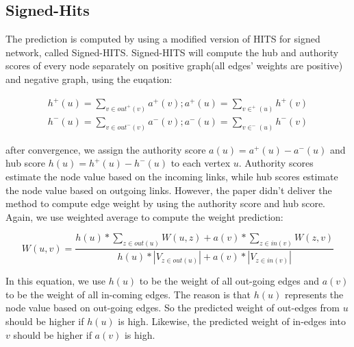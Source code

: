 
\subsection{Signed-Hits}

The prediction is computed by using a modified version of HITS for signed network, called Signed-HITS\cite{shahriari2014ranking}. Signed-HITS will compute the hub and authority scores of every node separately on positive graph(all edges' weights are positive) and negative graph, using the euqation:

\begin{equation}
\begin{aligned}
h^+(u) = \sum_{v\in out^+(v)}{a^+(v)} ; a^+(u) = \sum_{v\in ^+(u)}{h^+(v)}\\
h^-(u) = \sum_{v\in out^-(v)}{a^-(v)} ; a^-(u) = \sum_{v\in ^-(u)}{h^-(v)}
\end{aligned}
\end{equation}

after convergence, we assign the authority score $a(u)=a^+(u)-a^-(u)$ and hub score $h(u)=h^+(u)-h^-(u)$ to each vertex $u$. Authority scores estimate the node value based on the incoming links, while hub scores estimate the node value based on outgoing links. However, the paper\cite{kumar2016edge} didn't deliver the method to compute edge weight by using the authority score and hub score. Again, we use weighted average to compute the weight prediction:

\begin{equation}
W(u,v) = \frac{h(u)*\sum_{z\in out(u)} W(u,z) + a(v)*\sum_{z\in in(v)} W(z,v)}{h(u) * |V_{z\in out(u)}| + a(v) * |V_{z\in in(v)}|}
\end{equation}

In this equation, we use $h(u)$ to be the weight of all out-going edges and $a(v)$ to be the weight of all in-coming edges. The reason is that $h(u)$ represents the node value based on out-going edges. So the predicted weight of out-edges from $u$ should be higher if $h(u)$ is high. Likewise, the predicted weight of in-edges into $v$ should be higher if $a(v)$ is high.